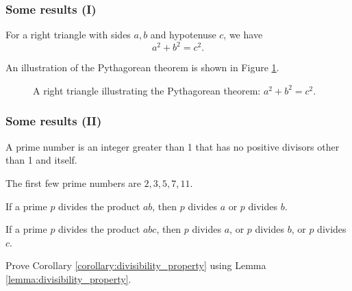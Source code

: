 \documentclass{beamerunicatt}
\begin{document}
\begin{frame}
\frametitle{Some results (I)}
\begin{theorem}[Pythagoras]
For a right triangle with sides $a, b$ and hypotenuse $c$, we have
\[
a^2 + b^2 = c^2.
\]
\end{theorem}

An illustration of the Pythagorean theorem is shown in Figure \ref{fig:pythagorean}.

\begin{figure}
\centering
{}
\caption{A right triangle illustrating the Pythagorean theorem: $a^2 + b^2 = c^2$.}
\label{fig:pythagorean}
\end{figure}

\end{frame}

\begin{frame}
\frametitle{Some results (II)}
\begin{definition}
A prime number is an integer greater than 1 that has no positive divisors other than 1 and itself.
\end{definition}

\begin{example}
The first few prime numbers are $2, 3, 5, 7, 11$.
\end{example}

\begin{lemma}
If a prime $p$ divides the product $ab$, then $p$ divides $a$ or $p$ divides $b$.
\label{lemma:divisibility_property}
\end{lemma}

\begin{corollary}
If a prime $p$ divides the product $abc$, then $p$ divides $a$, or $p$ divides $b$, or $p$ divides $c$.
\label{corollary:divisibility_property}
\end{corollary}

\begin{exercise}
Prove Corollary \ref{corollary:divisibility_property} using Lemma \ref{lemma:divisibility_property}.
\end{exercise}

\end{frame}
\end{document}
